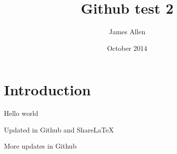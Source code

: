 \documentclass{article}
\title{Github test 2}
\author{James Allen}
\date{October 2014}
\begin{document}
\maketitle

\section{Introduction}

Hello world

Updated in Github and ShareLaTeX

More updates in Github
\end{document}
